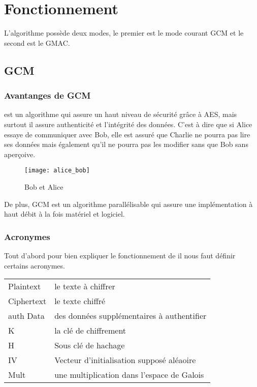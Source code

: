 \chapter{Fonctionnement}
\label{chap:fonctionnement}

L'algorithme \aes possède deux modes, le premier est le mode courant GCM et le second est le GMAC.

\section{GCM}

\subsection{Avantanges de GCM}

\aes est un algorithme qui assure un haut niveau de sécurité grâce à AES, mais surtout il assure authenticité et l'intégrité des données. C'est à dire que si Alice essaye de communiquer avec Bob, elle est assuré que Charlie ne pourra pas lire ses données mais également qu'il ne pourra pas les modifier sans que Bob sans aperçoive. 

\begin{figure}[!h]
  \centering
  \texttt{[image: alice\_bob]}
  \caption{Bob et Alice}
  \label{Bob et Alice}
\end{figure}


De plus, GCM est un algorithme parallélisable qui assure une implémentation à haut débit à la fois matériel et logiciel.

\subsection{Acronymes}


Tout d'abord pour bien expliquer le fonctionnement de \aes il nous faut définir certains acronymes.

\begin{center}
  \begin{tabular}[h]{|l|l|}
    \hline
    Plaintext&le texte à chiffrer\\
    Ciphertext&le texte chiffré\\
    auth Data&des données supplémentaires à authentifier\\
    K&la clé de chiffrement\\
    H&Sous clé de hachage\\
    IV& Vecteur d'initialisation supposé aléaoire\\
    Mult&une multiplication dans l'espace de Galois\\
    \hline
  \end{tabular}
\end{center}


